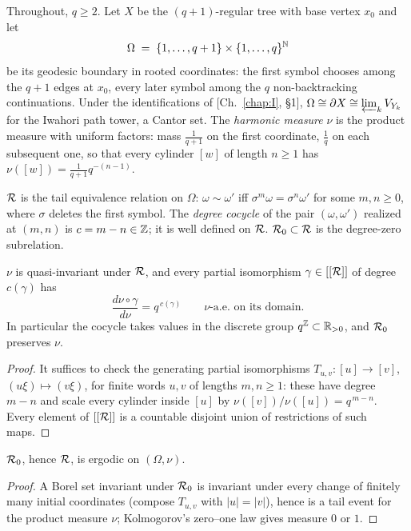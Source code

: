 Throughout, $q\ge2$. Let $X$ be the $(q+1)$-regular tree with base vertex $x_0$ and let
\[
\Omega\;=\;\{1,\dots,q+1\}\times\{1,\dots,q\}^{\mathbb{N}}
\]
be its geodesic boundary in rooted coordinates: the first symbol chooses among the
$q+1$ edges at $x_0$, every later symbol among the $q$ non-backtracking continuations.
Under the identifications of [Ch.~\ref{chap:I}, \S1], $\Omega\cong\partial X\cong\varprojlim_kV_{Y_k}$
for the Iwahori path tower, a Cantor set. The \emph{harmonic measure} $\nu$ is the
product measure with uniform factors: mass $\tfrac1{q+1}$ on the first coordinate,
$\tfrac1q$ on each subsequent one, so that every cylinder $[w]$ of length $n\ge1$ has
$\nu([w])=\tfrac1{q+1}q^{-(n-1)}$.

\begin{definition}
$\mathcal{R}$ is the tail equivalence relation on $\Omega$:
$\omega\sim\omega'$ iff $\sigma^m\omega=\sigma^n\omega'$ for some $m,n\ge0$, where
$\sigma$ deletes the first symbol. The \emph{degree cocycle} of the pair
$(\omega,\omega')$ realized at $(m,n)$ is $c=m-n\in\mathbb{Z}$; it is well defined on $\mathcal{R}$.
$\mathcal{R}_0\subset\mathcal{R}$ is the degree-zero subrelation.
\end{definition}

\begin{lemma}\label{III:lem:rn}
$\nu$ is quasi-invariant under $\mathcal{R}$, and every partial isomorphism
$\gamma\in[[\mathcal{R}]]$ of degree $c(\gamma)$ has
\[
\frac{d\nu\circ\gamma}{d\nu}=q^{\,c(\gamma)}\qquad\nu\text{-a.e.\ on its domain.}
\]
In particular the cocycle takes values in the discrete group $q^{\mathbb{Z}}\subset\mathbb{R}_{>0}$,
and $\mathcal{R}_0$ preserves $\nu$.
\end{lemma}

\begin{proof}
It suffices to check the generating partial isomorphisms
$T_{u,v}\colon[u]\to[v]$, $(u\xi)\mapsto(v\xi)$, for finite words $u,v$ of lengths
$m,n\ge1$: these have degree $m-n$ and scale every cylinder inside $[u]$ by
$\nu([v])/\nu([u])=q^{\,m-n}$. Every element of $[[\mathcal{R}]]$ is a countable disjoint union
of restrictions of such maps.
\end{proof}

\begin{lemma}[Ergodicity]\label{III:lem:ergodic}
$\mathcal{R}_0$, hence $\mathcal{R}$, is ergodic on $(\Omega,\nu)$.
\end{lemma}

\begin{proof}
A Borel set invariant under $\mathcal{R}_0$ is invariant under every change of finitely many
initial coordinates (compose $T_{u,v}$ with $|u|=|v|$), hence is a tail event for the
product measure $\nu$; Kolmogorov's zero--one law gives measure $0$ or $1$.
\end{proof}

